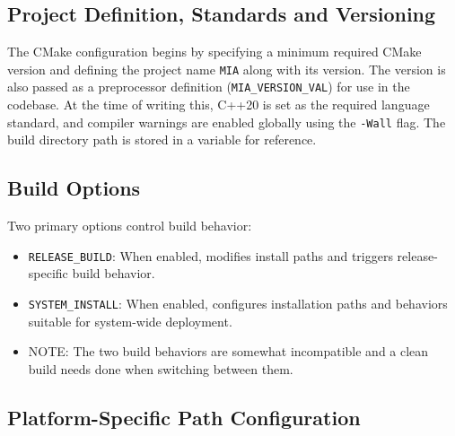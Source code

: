 \subsection{Project Definition, Standards and Versioning}

The CMake configuration begins by specifying a minimum required CMake version and defining the project name \texttt{MIA} along with its version. The version is also passed as a preprocessor definition (\texttt{MIA\_VERSION\_VAL}) for use in the codebase. At the time of writing this, C++20 is set as the required language standard, and compiler warnings are enabled globally using the \texttt{-Wall} flag. The build directory path is stored in a variable for reference.

\subsection{Build Options}

Two primary options control build behavior:
\begin{itemize}
	\item \texttt{RELEASE\_BUILD}: When enabled, modifies install paths and triggers release-specific build behavior.
	\item \texttt{SYSTEM\_INSTALL}: When enabled, configures installation paths and behaviors suitable for system-wide deployment.
	\item NOTE: The two build behaviors are somewhat incompatible and a clean build needs done when switching between them.
\end{itemize}

\subsection{Platform-Specific Path Configuration}

